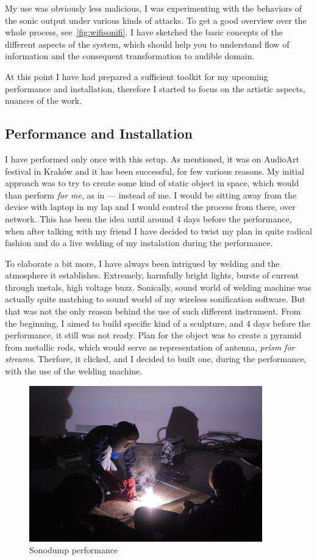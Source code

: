 \documentclass[12pt,a4paper,oneside]{report}
\begin{document}
My use was obviously less malicious, I was experimenting with the behaviors of the sonic output under various kinds of attacks. To get a good overview over the whole process, see~\ref{fig:wifisonifi}. I have sketched the basic concepts of the different aspects of the system, which should help you to understand flow of information and the consequent transformation to audible domain.

At this point I have had prepared a sufficient toolkit for my upcoming performance and installation, therefore I started to focus on the artistic aspects, nuances of the work.

\subsection{Performance and Installation}
I have performed only once with this setup. As mentioned, it was on AudioArt festival in Kraków and it has been successful, for few various reasons. My initial approach was to try to create some kind of static object in space, which would than perform \emph{for me}, as in --- instead of me. I would be sitting away from the device with laptop in my lap and I would control the process from there, over network. This has been the idea until around 4 days before the performance, when after talking with my friend I have decided to twist my plan in quite radical fashion and do a live welding of my instalation during the performance.

To elaborate a bit more, I have always been intrigued by welding and the atmosphere it establishes. Extremely, harmfully bright lights, bursts of current through metals, high voltage buzz. Sonically, sound world of welding machine was actually quite matching to sound world of my wireless sonification software. But that was not the only reason behind the use of such different instrument. From the beginning, I aimed to build specific kind of a sculpture, and 4 days before the performance, it still was not ready. Plan for the object was to create a pyramid from metallic rods, which would serve as representation of antenna, \textit{prism for streams}. Therfore, it clicked, and I decided to built one, during the performance, with the use of the welding machine.

\begin{figure}  
  \centering
    \includegraphics[width=0.9\textwidth]{img/zvarac}
	\caption{Sonodump performance}
	\label{fig:zvarac}
\end{figure}
\end{document}
